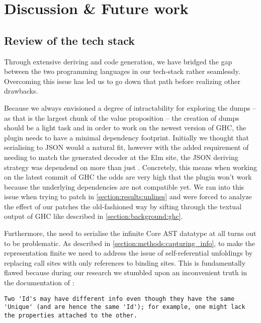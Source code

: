 \chapter{Discussion \& Future work}

\section{Review of the tech stack}

Through extensive deriving and code generation, we have bridged the gap between the two programming languages in our tech-stack
rather seamlessly. Overcoming this issue has led us to go down that path before realizing other drawbacks.

Because we always envisioned a degree of intractability for exploring the dumps -- as that is the largest chunk of the value proposition --
the creation of dumps should be a light task and in order to work on the newest version of GHC, the plugin needs to have
a minimal dependency footprint. Initially we thought that serialising to JSON would a natural fit, however with the added requirement
of needing to match the generated decoder at the Elm site, the JSON deriving strategy was dependend on more than just .
Concretely, this means when working on the latest commit of GHC the odds are very high that the plugin won't work because the underlying
dependencies are not compatible yet. We ran into this issue when trying to patch  in \cref{section:results:unlines} and were
forced to analyze the effect of our patches the old-fashioned way by sifting through the textual output of GHC like described in \cref{section:background:ghc}.

Furthermore, the need to serialise the infinite Core AST datatype at all turns out to be problematic. 
As described in \cref{section:methods:capturing_info}, to make the representation finite we need to address the
issue of self-referential unfoldings by replacing call sites with only references to binding sites. This is fundamentally
flawed because during our research we stumbled upon an inconvenient truth in the documentation of :

\begin{listing}[H]
\begin{verbatim}
Two 'Id's may have different info even though they have the same
'Unique' (and are hence the same 'Id'); for example, one might lack
the properties attached to the other.
\end{verbatim}
\end{listing}

